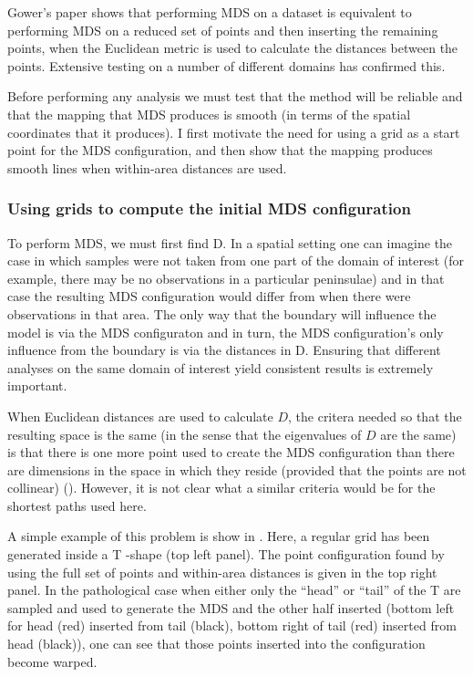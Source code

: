 Gower's paper shows that performing MDS on a dataset is equivalent to performing MDS on a reduced set of points and then inserting the remaining points, when the Euclidean metric is used to calculate the distances between the points. Extensive testing on a number of different domains has confirmed this.

Before performing any analysis we must test that the method will be reliable and that the mapping that MDS produces is smooth (in terms of the spatial coordinates that it produces). I first motivate the need for using a grid as a start point for the MDS configuration, and then show that the mapping produces smooth lines when within-area distances are used.

\subsubsection{Using grids to compute the initial MDS configuration}
\label{grids}

To perform MDS, we must first find D. In a spatial setting one can imagine the case in which samples were not taken from one part of the domain of interest (for example, there may be no observations in a particular peninsulae) and in that case the resulting MDS configuration would differ from when there were observations in that area. The only way that the boundary will influence the model is via the MDS configuraton and in turn, the MDS configuration's only influence from the boundary is via the distances in D. Ensuring that different analyses on the same domain of interest yield consistent results is extremely important. 

When Euclidean distances are used to calculate $D$, the critera needed so that the resulting space is the same (in the sense that the eigenvalues of $D$ are the same) is that there is one more point used to create the MDS configuration than there are dimensions in the space in which they reside (provided that the points are not collinear) (\cite{landmark}). However, it is not clear what a similar criteria would be for the shortest paths used here. 

A simple example of this problem is show in . Here, a regular grid has been generated inside a T -shape (top left panel). The point configuration found by using the full set of points and within-area distances is given in the top right panel. In the pathological case when either only the ``head'' or ``tail'' of the T are sampled and used to generate the MDS and the other half inserted (bottom left for head (red) inserted from tail (black), bottom right of tail (red) inserted from head (black)), one can see that those points inserted into the configuration become warped. 

